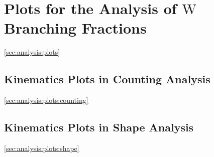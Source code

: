 
\chapter{Plots for the Analysis of $\mathrm{W}$ Branching Fractions}
\ref{sec:analysis:plots}

\section{Kinematics Plots in Counting Analysis}
\ref{sec:analysis:plots:counting}


\FloatBarrier



\section{Kinematics Plots in Shape Analysis}
\ref{sec:analysis:plots:shape}


\FloatBarrier

\FloatBarrier

\FloatBarrier

\FloatBarrier

\FloatBarrier

\FloatBarrier

\FloatBarrier
